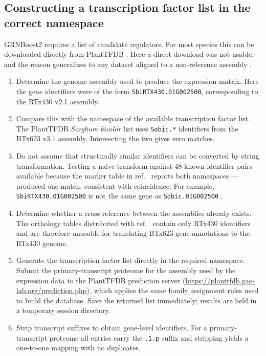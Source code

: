 \subsection{Constructing a transcription factor list in the correct namespace}

GRNBoost2 requires a list of candidate regulators. For most species this can be downloaded directly from PlantTFDB \cite{tian2020,jin2017}. Here a direct download was not usable, and the reason generalizes to any dataset aligned to a non-reference assembly .

\begin{enumerate}[leftmargin=*]
\item Determine the genome assembly used to produce the expression matrix. Here the gene identifiers were of the form \texttt{SbiRTX430.01G002500}, corresponding to the RTx430 v2.1 assembly.

\item Compare this with the namespace of the available transcription factor list. The PlantTFDB \textit{Sorghum bicolor} list uses \texttt{Sobic.*} identifiers from the BTx623 v3.1 assembly. Intersecting the two gives zero matches.

\item Do not assume that structurally similar identifiers can be converted by string transformation. Testing a naive transform against 48 known identifier pairs --- available because the marker table in ref.~\cite{baumgart2025} reports both namespaces --- produced one match, consistent with coincidence. For example, \texttt{SbiRTX430.01G002500} is not the same gene as \texttt{Sobic.01G002500} .

\item Determine whether a cross-reference between the assemblies already exists. The orthology tables distributed with ref.~\cite{baumgart2025} contain only RTx430 identifiers and are therefore unusable for translating BTx623 gene annotations to the RTx430 genome.

\item Generate the transcription factor list directly in the required namespace. Submit the primary-transcript proteome for the assembly used by the expression data to the PlantTFDB prediction server (\url{https://planttfdb.gao-lab.org/prediction.php}), which applies the same family assignment rules used to build the database. Save the returned list immediately; results are held in a temporary session directory.

\item Strip transcript suffixes to obtain gene-level identifiers. For a primary-transcript proteome all entries carry the \texttt{.1.p} suffix and stripping yields a one-to-one mapping with no duplicates.
\end{enumerate}

